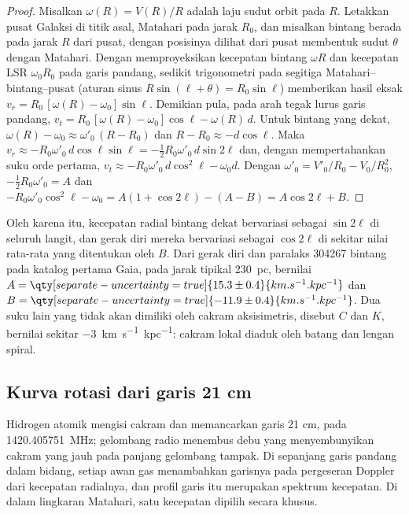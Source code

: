 \begin{proof}
Misalkan $\omega(R) = V(R)/R$ adalah laju sudut orbit pada $R$. Letakkan
pusat Galaksi di titik asal, Matahari pada jarak $R_0$, dan misalkan
bintang berada pada jarak $R$ dari pusat, dengan posisinya dilihat dari
pusat membentuk sudut $\theta$ dengan Matahari. Dengan memproyeksikan
kecepatan bintang $\omega R$ dan kecepatan LSR $\omega_0 R_0$ pada garis
pandang, sedikit trigonometri pada segitiga Matahari--bintang--pusat (aturan
sinus $R\sin(\ell + \theta) = R_0\sin\ell$) memberikan hasil eksak
$v_r = R_0\,[\omega(R) - \omega_0]\sin\ell$. Demikian pula, pada arah
tegak lurus garis pandang,
$v_t = R_0\,[\omega(R) - \omega_0]\cos\ell - \omega(R)\,d$. Untuk bintang yang
dekat, $\omega(R) - \omega_0 \approx \omega'_0\,(R - R_0)$ dan
$R - R_0 \approx -d\cos\ell$. Maka
$v_r \approx -R_0\omega'_0\,d\cos\ell\sin\ell = -\tfrac12 R_0\omega'_0\,
d\sin 2\ell$ dan, dengan mempertahankan suku orde pertama,
$v_t \approx -R_0\omega'_0\,d\cos^2\ell - \omega_0 d$. Dengan
$\omega'_0 = V'_0/R_0 - V_0/R_0^2$, $-\tfrac12 R_0\omega'_0 = A$ dan
$-R_0\omega'_0\cos^2\ell - \omega_0 = A(1 + \cos 2\ell) - (A - B) =
A\cos 2\ell + B$.
\end{proof}

Oleh karena itu, kecepatan radial bintang dekat bervariasi sebagai $\sin 2\ell$ di seluruh
langit, dan gerak diri mereka bervariasi sebagai $\cos 2\ell$ di sekitar nilai rata-rata yang ditentukan oleh $B$.
Dari gerak diri dan paralaks \num{304267} bintang pada katalog pertama
Gaia, pada jarak tipikal \qty{230}{pc}, 
bernilai $A = \qty[separate-uncertainty=true]{15.3 \pm 0.4}{km.s^{-1}.kpc^{-1}}$
dan $B = \qty[separate-uncertainty=true]{-11.9 \pm 0.4}{km.s^{-1}.kpc^{-1}}$.
Dua suku lain yang tidak akan dimiliki oleh cakram aksisimetris, disebut $C$
dan $K$, bernilai sekitar \qty{-3}{km.s^{-1}.kpc^{-1}}: cakram lokal
diaduk oleh batang dan lengan spiral.

\subsection*{Kurva rotasi dari garis 21 cm}

Hidrogen atomik mengisi cakram dan memancarkan garis 21 cm, pada
\qty{1420.405751}{MHz}; gelombang radio menembus debu yang menyembunyikan
cakram yang jauh pada panjang gelombang tampak. Di sepanjang garis pandang
dalam bidang, setiap awan gas menambahkan garisnya pada pergeseran Doppler
dari kecepatan radialnya, dan profil garis itu merupakan spektrum kecepatan.
Di dalam lingkaran Matahari, satu kecepatan dipilih secara khusus.

